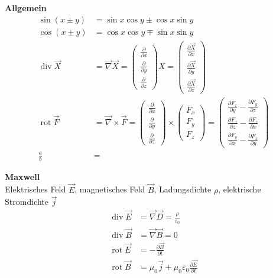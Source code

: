 \documentclass[landscape,8pt]{scrartcl}
\newcommand{\myheading}[1]{\noindent\textbf{#1}\\}
\begin{document}
\begin{multicols}{3}
\myheading{Allgemein}
\begin{align*}
\sin(x\pm y) &= \sin x \cos y \pm \cos x \sin y	\\
\cos(x\pm y) &= \cos x \cos y \mp \sin x \sin y \\
\operatorname{div} \vec X &= \vec \nabla \vec X 
= \begin{pmatrix}\frac{\partial}{\partial x}\\\frac{\partial}{\partial y}\\\frac{\partial}{\partial z}\end{pmatrix}X 
=\begin{pmatrix}\frac{\partial \vec X}{\partial x}\\\frac{\partial \vec X}{\partial y}\\\frac{\partial \vec X}{\partial z}\end{pmatrix} \\
\operatorname{rot}\vec F &= \vec\nabla\times \vec F =\begin{pmatrix}  \frac{\partial}{\partial x} \\  \frac{\partial}{\partial y} \\  \frac{\partial}{\partial z}\end{pmatrix}\times\begin{pmatrix}  F_x\\  F_y\\  F_z\end{pmatrix}=\begin{pmatrix}  \frac{\partial F_z}{\partial y} - \frac{\partial F_y}{\partial z} \\  \frac{\partial F_x}{\partial z} - \frac{\partial F_z}{\partial x} \\  \frac{\partial F_y}{\partial x} - \frac{\partial F_x}{\partial y}\end{pmatrix}\\
\frac{a}{b} &= 
\end{align*}

\myheading{Maxwell}
Elektrisches Feld $\vec E$, magnetisches Feld $\vec B$, Ladungsdichte $\rho$, elektrische Stromdichte $\vec j$
\begin{align*}
\operatorname{div} \vec E &= \vec \nabla \vec D = \frac \rho {\varepsilon_0} \\
\operatorname{div} \vec B &= \vec \nabla \vec B = 0 \\
\operatorname{rot} \vec E &= -\frac{\partial \vec B}{\partial t} \\
\operatorname{rot} \vec B &= \mu_0 \vec j+ \mu_0 \varepsilon_0 \frac{\partial \vec E}{\partial t} \\
\end{align*}
 
 
 
\end{multicols}
\end{document}
